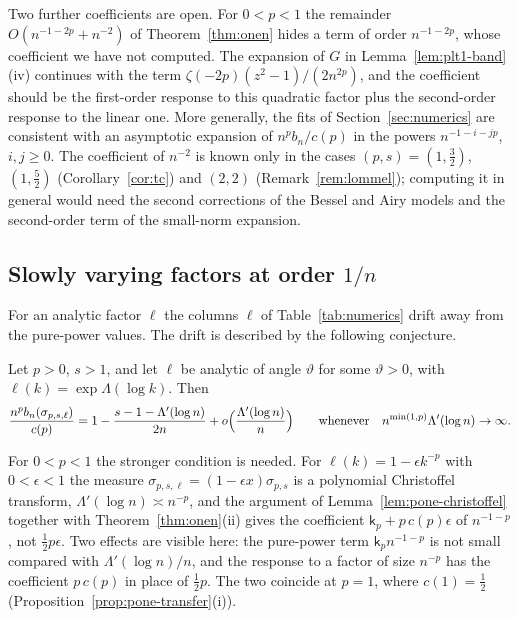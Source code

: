 Two further coefficients are open. For $0<p<1$ the remainder $O(n^{-1-2p}+n^{-2})$ of Theorem~\ref{thm:onen} hides a
term of order $n^{-1-2p}$, whose coefficient we have not computed. The expansion of $G$ in
Lemma~\ref{lem:plt1-band}(iv) continues with the term $\zeta(-2p)(z^2-1)/(2n^{2p})$, and the coefficient should be the
first-order response to this quadratic factor plus the second-order response to the linear one. More generally, the
fits of Section~\ref{sec:numerics} are consistent with an asymptotic expansion of $n^pb_n/c(p)$ in the powers
$n^{-1-i-jp}$, $i,j\ge0$. The coefficient of $n^{-2}$ is known only in the cases $(p,s)=(1,\frac32)$, $(1,\frac52)$
(Corollary~\ref{cor:tc}) and $(2,2)$ (Remark~\ref{rem:lommel}); computing it in general would need the second
corrections of the Bessel and Airy models and the second-order term of the small-norm expansion.

\subsection{Slowly varying factors at order \texorpdfstring{$1/n$}{1/n}}\label{sec:tilt}
For an analytic factor $\ell$ the columns $\ell$ of Table~\ref{tab:numerics} drift away from the pure-power values. The
drift is described by the following conjecture.

\begin{conjecture}\label{conj:tilt}
Let $p>0$, $s>1$, and let $\ell$ be analytic of angle $\vartheta$ for some $\vartheta>0$, with
$\ell(k)=\exp\Lambda(\log k)$. Then
\[
  \frac{n^pb_n(\sigma_{p,s,\ell})}{c(p)}=1-\frac{s-1-\Lambda'(\log n)}{2n}+o\Bigl(\frac{\Lambda'(\log n)}{n}\Bigr)
  \qquad\text{whenever}\quad n^{\min(1,p)}\Lambda'(\log n)\to\infty.
\]
\end{conjecture}

For $0<p<1$ the stronger condition is needed. For $\ell(k)=1-\epsilon k^{-p}$ with $0<\epsilon<1$ the measure
$\sigma_{p,s,\ell}=(1-\epsilon x)\sigma_{p,s}$ is a polynomial Christoffel transform, $\Lambda'(\log n)\asymp n^{-p}$, and the
argument of Lemma~\ref{lem:pone-christoffel} together with Theorem~\ref{thm:onen}(ii) gives the coefficient
$\mathsf k_p+p\,c(p)\epsilon$ of $n^{-1-p}$, not $\frac12p\epsilon$. Two effects are visible here: the pure-power term
$\mathsf k_pn^{-1-p}$ is not small compared with $\Lambda'(\log n)/n$, and the response to a factor of size $n^{-p}$ has
the coefficient $p\,c(p)$ in place of $\frac12p$. The two coincide at $p=1$, where $c(1)=\frac12$
(Proposition~\ref{prop:pone-transfer}(i)).

